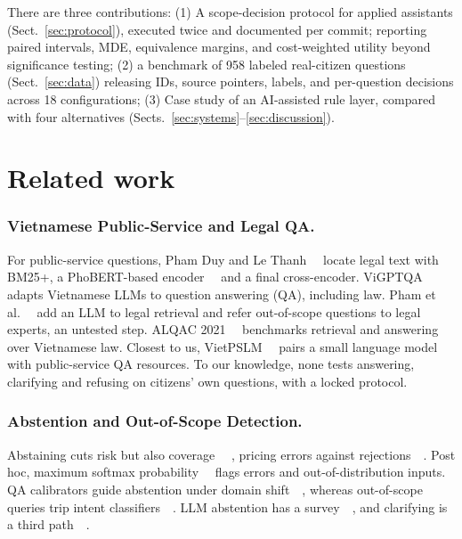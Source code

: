 \documentclass[runningheads]{llncs}
\begin{document}
{There are three contributions: (1) A scope-decision protocol for applied assistants (Sect.~\ref{sec:protocol}), executed twice and documented per commit; reporting paired intervals, MDE, equivalence margins, and cost-weighted utility beyond significance testing; (2) a benchmark of 958 labeled real-citizen questions (Sect.~\ref{sec:data}) releasing IDs, source pointers, labels, and per-question decisions across 18 configurations; (3) Case study of an AI-assisted rule layer, compared with four alternatives (Sects.~\ref{sec:systems}--\ref{sec:discussion}).}

\section{Related work}

\subsubsection{Vietnamese Public-Service and Legal QA.}

{For public-service questions, Pham Duy and Le Thanh~~\cite{phamduy2023} locate legal text with BM25+, a PhoBERT-based encoder~~\cite{nguyen2020phobert} and a final cross-encoder. ViGPTQA~~\cite{vigptqa2023} adapts Vietnamese LLMs to question answering (QA), including law. Pham et al.~~\cite{hien2025} add an LLM to legal retrieval and refer out-of-scope questions to legal experts, an untested step. ALQAC 2021~~\cite{alqac2021} benchmarks retrieval and answering over Vietnamese law. Closest to us, VietPSLM~~\cite{le2025vietpslm} pairs a small language model with public-service QA resources. To our knowledge, none tests answering, clarifying and refusing on citizens' own questions, with a locked protocol.
}

\subsubsection{Abstention and Out-of-Scope Detection.}

{Abstaining cuts risk but also coverage~~\cite{elyaniv2010,geifman2017}
, pricing errors against rejections~~\cite{chow1970}. Post hoc, maximum softmax probability~~\cite{hendrycks2017} flags errors and out-of-distribution inputs. QA calibrators guide abstention under domain shift~~\cite{kamath2020}, whereas out-of-scope queries trip intent classifiers~~\cite{larson2019}. LLM abstention has a survey~~\cite{wen2025}, and clarifying is a third path~~\cite{aliannejadi2019}.}
\end{document}
